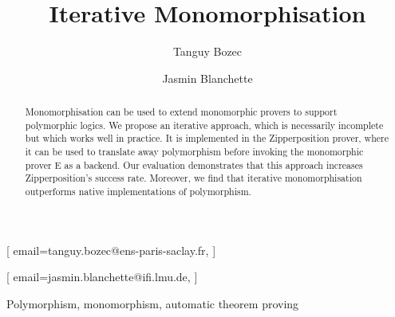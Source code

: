 \documentclass[]{ceurart}
\begin{document}



\title{Iterative Monomorphisation}

\author[1,2]{Tanguy Bozec}[%
email=tanguy.bozec@ens-paris-saclay.fr,
]
\author[2]{Jasmin Blanchette}[%
email=jasmin.blanchette@ifi.lmu.de,
]
\address[1]{ENS Paris-Saclay, Université Paris-Saclay, France}
\address[2]{Institute of Informatics, Ludwig-Maximilians-Universität München, Germany}


\begin{abstract}
Monomorphisation can be used to extend monomorphic provers to support polymorphic logics. We propose an iterative approach, which is necessarily incomplete but which works well in practice. It is implemented in the Zipperposition prover, where it can be used to translate away polymorphism before invoking the monomorphic prover E as a backend. Our evaluation demonstrates that this approach increases Zipperposition's success rate. Moreover, we find that iterative monomorphisation outperforms native implementations of polymorphism.
\end{abstract}

\begin{keywords}
   Polymorphism\sep
   monomorphism\sep
   automatic theorem proving
\end{keywords}
\end{document}
